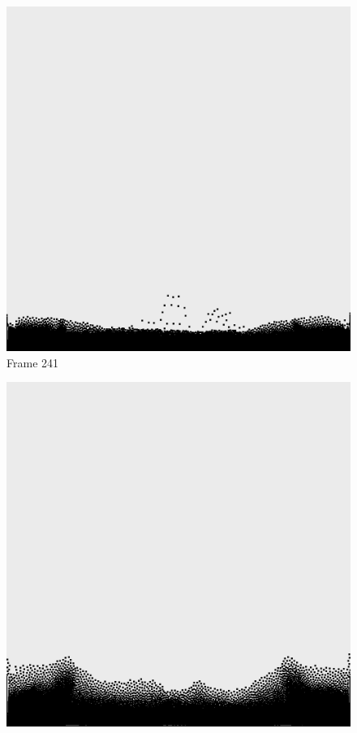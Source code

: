\documentclass[a4paper, 12pt, oneside]{book}
\begin{document}
\begin{figure}[!ht]
    \addvspace{0.5ex}
        \begin{center}
            \includegraphics[width=\linewidth]{images/test_case_1/241.png}
            Frame 241
        \end{center}
    \endminipage
    \hfill
        \begin{center}
            \includegraphics[width=\linewidth]{images/test_case_1/261.png}

\end{center}
\end{figure}
\end{document}

